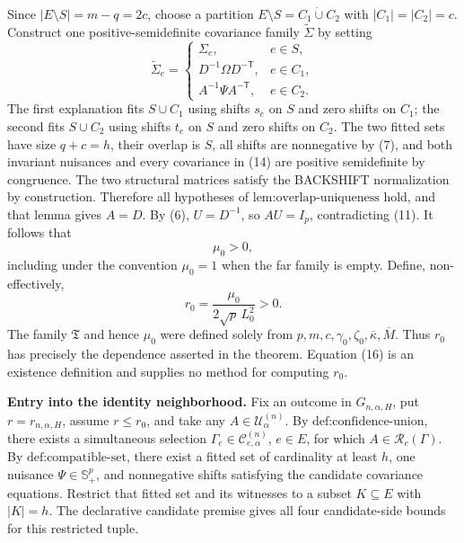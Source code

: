 Since \(|E\setminus S|=m-q=2c\), choose a partition \(E\setminus S=C_1\mathbin{\dot\cup}C_2\) with \(|C_1|=|C_2|=c\). Construct one positive-semidefinite covariance family \(\widetilde\Sigma\) by setting
\[
\widetilde\Sigma_e=
\begin{cases}
\Sigma_e,&e\in S,\\
D^{-1}\Omega D^{-\mathsf T},&e\in C_1,\\
A^{-1}\Psi A^{-\mathsf T},&e\in C_2.
\end{cases}
\tag{14}
\]
The first explanation fits \(S\cup C_1\) using shifts \(s_e\) on \(S\) and zero shifts on \(C_1\); the second fits \(S\cup C_2\) using shifts \(t_e\) on \(S\) and zero shifts on \(C_2\). The two fitted sets have size \(q+c=h\), their overlap is \(S\), all shifts are nonnegative by (7), and both invariant nuisances and every covariance in (14) are positive semidefinite by congruence. The two structural matrices satisfy the BACKSHIFT normalization by construction. Therefore all hypotheses of \(\text{lem:overlap-uniqueness}\) hold, and that lemma gives \(A=D\). By (6), \(U=D^{-1}\), so \(AU=I_p\), contradicting (11). It follows that
\[
\mu_0>0,
\tag{15}
\]
including under the convention \(\mu_0=1\) when the far family is empty. Define, non-effectively,
\[
r_0=\frac{\mu_0}{2\sqrt p\,L_0^2}>0.
\tag{16}
\]
The family \(\mathfrak T\) and hence \(\mu_0\) were defined solely from \(p,m,c,\gamma_0,\zeta_0,\overline\kappa,\overline M\). Thus \(r_0\) has precisely the dependence asserted in the theorem. Equation (16) is an existence definition and supplies no method for computing \(r_0\).

\textbf{Entry into the identity neighborhood.}
Fix an outcome in \(G_{n,\alpha,H}\), put \(r=r_{n,\alpha,H}\), assume \(r\leq r_0\), and take any \(A\in\mathcal U^{(n)}_\alpha\). By \(\text{def:confidence-union}\), there exists a simultaneous selection \(\Gamma_e\in\mathcal C^{(n)}_{e,\alpha}\), \(e\in E\), for which \(A\in\mathcal R_c(\Gamma)\). By \(\text{def:compatible-set}\), there exist a fitted set of cardinality at least \(h\), one nuisance \(\Psi\in\mathbb S_+^p\), and nonnegative shifts satisfying the candidate covariance equations. Restrict that fitted set and its witnesses to a subset \(K\subseteq E\) with \(|K|=h\). The declarative candidate premise gives all four candidate-side bounds for this restricted tuple.

